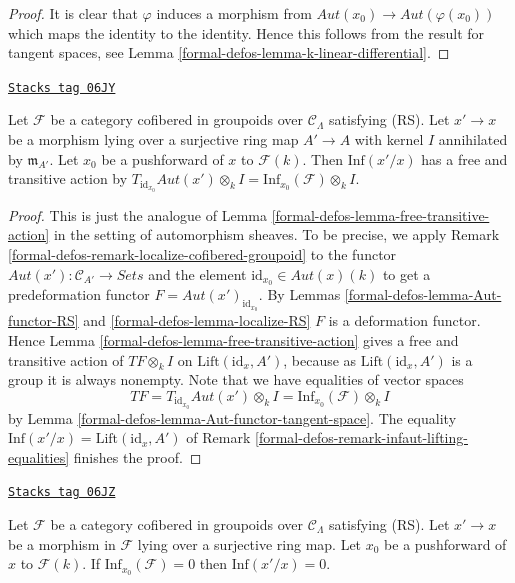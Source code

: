 \begin{proof}
It is clear that $\varphi$ induces a morphism from
$\mathit{Aut}(x_0) \to \mathit{Aut}(\varphi(x_0))$
which maps the identity to the identity. Hence this follows from
the result for tangent spaces, see
Lemma \ref{formal-defos-lemma-k-linear-differential}.
\end{proof}

\begin{lemma}
\label{formal-defos-lemma-lifted-automorphisms-torsor}
\href{https://stacks.math.columbia.edu/tag/06JY}{\texttt{Stacks tag 06JY}}

Let $\mathcal{F}$ be a category cofibered in groupoids over
$\mathcal{C}_\Lambda$ satisfying (RS). Let $x' \to x$ be a
morphism lying over a surjective ring map $A' \to A$ with kernel $I$
annihilated by $\mathfrak m_{A'}$. Let $x_0$ be a pushforward of $x$ to
$\mathcal{F}(k)$. Then $\text{Inf}(x'/x)$ has a free and transitive action by
$T_{\text{id}_{x_0}} \mathit{Aut}(x') \otimes_k I
= \text{Inf}_{x_0}(\mathcal{F}) \otimes_k I$.
\end{lemma}

\begin{proof}
This is just the analogue of
Lemma \ref{formal-defos-lemma-free-transitive-action}
in the setting of automorphism sheaves.
To be precise, we apply
Remark \ref{formal-defos-remark-localize-cofibered-groupoid}
to the functor $\mathit{Aut}(x') : \mathcal{C}_{A'} \to \textit{Sets}$
and the element $\text{id}_{x_0} \in \mathit{Aut}(x)(k)$ to get
a predeformation functor $F = \mathit{Aut}(x')_{\text{id}_{x_0}}$. By
Lemmas \ref{formal-defos-lemma-Aut-functor-RS} and \ref{formal-defos-lemma-localize-RS}
$F$ is a deformation functor. Hence
Lemma \ref{formal-defos-lemma-free-transitive-action}
gives a free and transitive action
of $TF \otimes_k I$ on $\text{Lift}(\text{id}_x, A')$, because as
$\text{Lift}(\text{id}_x, A')$ is a group it is always nonempty.
Note that we have equalities of vector spaces
$$
TF = T_{\text{id}_{x_0}} \mathit{Aut}(x') \otimes_k I =
\text{Inf}_{x_0}(\mathcal{F}) \otimes_k I
$$
by
Lemma \ref{formal-defos-lemma-Aut-functor-tangent-space}.
The equality $\text{Inf}(x'/x) = \text{Lift}(\text{id}_x, A')$ of
Remark \ref{formal-defos-remark-infaut-lifting-equalities}
finishes the proof.
\end{proof}

\begin{lemma}
\label{formal-defos-lemma-infaut-trivial}
\href{https://stacks.math.columbia.edu/tag/06JZ}{\texttt{Stacks tag 06JZ}}

Let $\mathcal{F}$ be a category cofibered in groupoids over
$\mathcal{C}_\Lambda$ satisfying (RS). Let $x' \to x$ be a morphism
in $\mathcal{F}$ lying over a surjective ring map. Let $x_0$ be a pushforward
of $x$ to $\mathcal{F}(k)$. If $\text{Inf}_{x_0}(\mathcal{F}) = 0$ then
$\text{Inf}(x'/x) = 0$.
\end{lemma}

